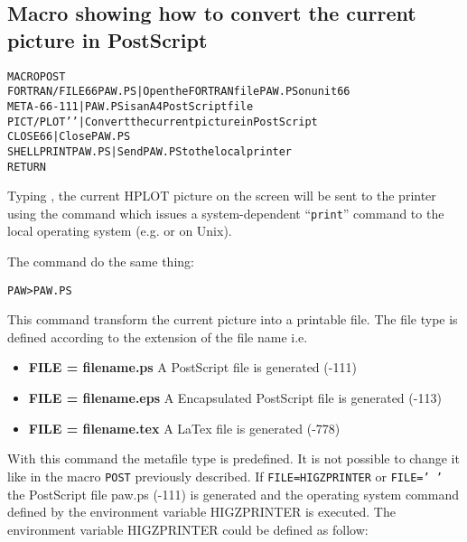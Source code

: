 \subsection*{Macro showing how to convert the current picture in
  PostScript}
\begin{alltt}
         MACRO POST
         FORTRAN/FILE 66 PAW.PS  | Open the FORTRAN file PAW.PS on unit 66
         META -66 -111           | PAW.PS is an A4 PostScript file
         PICT/PLOT ' '           | Convert the current picture in PostScript
         CLOSE 66                | Close PAW.PS
         SHELL PRINT PAW.PS      | Send PAW.PS to the local printer
         RETURN
\end{alltt}

Typing , the current HPLOT picture on the
screen will be sent to the printer using the  command
which issues a system-dependent ``\texttt{print}'' command to the local operating
system (e.g.  or  on Unix).

The command  do the same thing:

\begin{alltt}
PAW >  PAW.PS
\end{alltt}

This command transform the current picture into a printable file. The file 
type is defined according to the extension of the file name i.e.

\begin{itemize}
\item {\bf FILE = filename.ps }  A PostScript file is generated (-111)
\item {\bf FILE = filename.eps}  A Encapsulated PostScript file
                                 is generated (-113)
\item {\bf FILE = filename.tex}  A LaTex file is generated (-778)
\end{itemize}

With this command the metafile type is predefined. It is not possible to
change it like in the macro \texttt{POST} previously described.
If \texttt{FILE=HIGZPRINTER} or \texttt{FILE=' '} the PostScript file paw.ps (-111) is
generated and the operating system command defined by the environment
variable HIGZPRINTER is executed.
The environment variable HIGZPRINTER could be defined as follow:

\begin{alltt}
\end{alltt}

